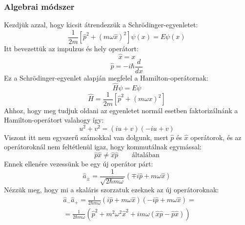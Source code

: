 \documentclass[a4paper,12pt]{article}
\begin{document}
\subsubsection*{Algebrai módszer}
Kezdjük azzal, hogy kicsit átrendezzük a Schrödinger-egyenletet:
\begin{equation}
    \frac{1}{2m} \left[\hat{p}^2 + (m \omega \hat{x})^2\right] \psi(x) = E \psi(x)
\end{equation}
Itt bevezettük az impulzus és hely operátort:
\begin{equation}
    \hat{x} = x
\end{equation}
\begin{equation}
    \hat{p} = - i \hbar \frac{d}{dx}
\end{equation}
Ez a Schrödinger-egyenlet alapján megfelel a Hamilton-operátornak:
\begin{equation}
    \hat{H}\psi = E\psi
\end{equation}
\begin{equation}
    \hat{H} = \frac{1}{2m} \left[\hat{p}^2 + (m \omega x)^2\right]
\end{equation}
Ahhoz, hogy meg tudjuk oldani az egyenletet normál esetben faktorizálnánk a Hamilton-operátort valahogy így:
\begin{equation}
    u^2 + v^2 = (iu + v)(- iu + v)
\end{equation}
Viszont itt nem egyszerű számokkal van dolgunk, mert $\hat{p}$ és $\hat{x}$ operátorok, és az operátoroknál nem feltétlenül igaz, hogy
kommutálnak egymással:
\begin{equation}
    \hat{p} \hat{x} \neq \hat{x} \hat{p} \qquad \text{általában}
\end{equation}
Ennek ellenére vezessünk be egy új operátor párt:
\begin{equation}
    \hat{a}_\pm = \frac{1}{\sqrt{2 \hbar m \omega}} \left( \mp i \hat{p} + m \omega \hat{x} \right)
\end{equation}
Nézzük meg, hogy mi a skaláris szorzatuk ezeknek az új operátoroknak:
\begin{equation}
    \begin{aligned}
    & \hat{a}_- \hat{a}_+ = \frac{1}{2 \hbar m \omega} \left( i \hat{p} + m \omega \hat{x} \right) \left( - i \hat{p} + m \omega \hat{x} \right) = \\
    & = \frac{1}{2 \hbar m \omega} \left( \hat{p}^2 + m^2 \omega^2 \hat{x}^2 + i m \omega (\hat{x} \hat{p} - \hat{p} \hat{x}) \right)
    \end{aligned}
\end{equation}
\end{document}
